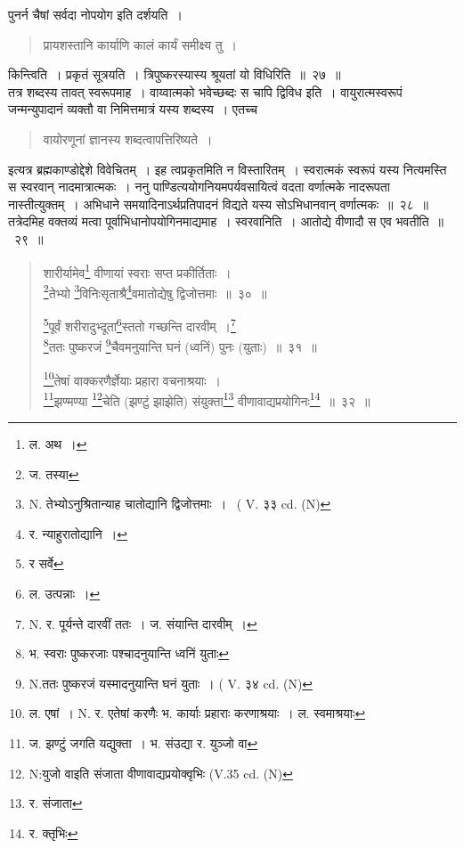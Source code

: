 \documentclass[11pt, openany]{book}
\begin{document}
पुनर्न चैषां सर्वदा नोपयोग इति दर्शयति~।

\begin{quote}
{\qt प्रायशस्तानि कार्याणि कालं कार्यं समीक्ष्य तु~।}
\end{quote}

\noindent
{\qtt किन्त्विति}~। प्रकृतं सूत्रयति~। {\qtt त्रिपुष्करस्यास्य श्रूयतां} यो विधिरिति~॥~२७~॥\\

तत्र शब्दस्य तावत् स्वरूपमाह~। {\qtt वाय्वात्मको भवेच्छब्दः स चापि द्विविध} इति~। वायुरात्मस्वरूपं जन्मन्युपादानं व्यक्तौ वा निमित्तमात्रं यस्य शब्दस्य~। एतच्च

\begin{quote}
{\qt वायोरणूनां ज्ञानस्य शब्दत्वापत्तिरिष्यते~। }
\end{quote}

\noindent
इत्यत्र ब्रह्मकाण्डोद्देशे विवेचितम्~। इह त्वप्रकृतमिति न विस्तारितम्~। स्वरात्मकं स्वरूपं यस्य नित्यमस्ति स {\qtt स्वरवान्} नादमात्रात्मकः~। ननु पाण्डित्ययोगनियमपर्यवसायित्वं वदता वर्णात्मके नादरूपता नास्तीत्युक्तम्~। अभिधाने समयादिनाऽर्थप्रतिपादनं विद्यते यस्य सोऽभिधानवान् वर्णात्मकः~॥~२८~॥\\

तत्रेदमिह वक्तव्यं मत्वा पूर्वाभिधानोपयोगिनमाद्यमाह~। {\qtt स्वरवानिति}~। आतोद्ये वीणादौ स एव भवतीति~॥~२९~॥

\newpage

\begin{quote}
{\na  शारीर्यामेव\renewcommand{\thefootnote}{1}\footnote{ल. अथ~।} वीणायां स्वराः सप्त प्रकीर्तिताः~।\\
 \renewcommand{\thefootnote}{2}\footnote{ज. तस्या}तेभ्यो \renewcommand{\thefootnote}{2a}\footnote{N. तेभ्योऽनुश्रितान्याह चातोद्यानि द्विजोत्तमाः~। \textendash\  ( V. ३३ cd. (N)}विनिःसृताश्रै\renewcommand{\thefootnote}{3}\footnote{र. न्याहुरातोद्यानि~।}वमातोद्येषु द्विजोत्तमाः~॥~३०~॥

 \renewcommand{\thefootnote}{4}\footnote{र सर्वे}पूर्वं शरीरादुभ्दूता\renewcommand{\thefootnote}{5}\footnote{ल. उत्पन्नाः~।}स्ततो गच्छन्ति दारवीम्~।\renewcommand{\thefootnote}{6}\footnote{N. र. पूर्यन्ते दारवीं ततः~। ज. संयान्ति दारवीम्~।}\\
 \renewcommand{\thefootnote}{7}\footnote{भ. स्वराः पुष्करजाः पश्चादनुयान्ति ध्वनिं युताः}ततः पुष्करजं \renewcommand{\thefootnote}{7a}\footnote{N.ततः पुष्करजं यस्मादनुयान्ति घनं युताः~। ( V. ३४ cd. (N)}चैवमनुयान्ति घनं (ध्वनिं) पुनः (युताः)~॥~३१~॥

 \renewcommand{\thefootnote}{8}\footnote{ल. एषां~। N. र. एतेषां करणैः भ. कार्याः प्रहाराः करणाश्रयाः~। ल. स्वमाश्रयाः}तेषां वाक्करणैर्ज्ञेयाः प्रहारा वचनाश्रयाः~।\\
 \renewcommand{\thefootnote}{9}\footnote{ज. झण्टुं जगति यद्युक्ता~। भ. संउद्या र. युञ्जो वा}झण्मण्या \renewcommand{\thefootnote}{9a}\footnote{N:युजो वाइति संजाता वीणावाद्यप्रयोक्वृभिः (V.35 cd. (N)}चेति (झण्टुं झाझेति) संयुक्ता\renewcommand{\thefootnote}{10}\footnote{र. संजाता} वीणावाद्यप्रयोगिनः\renewcommand{\thefootnote}{11}\footnote{र. क्तृभिः}~॥~३२~॥}
\end{quote}
\end{document}
